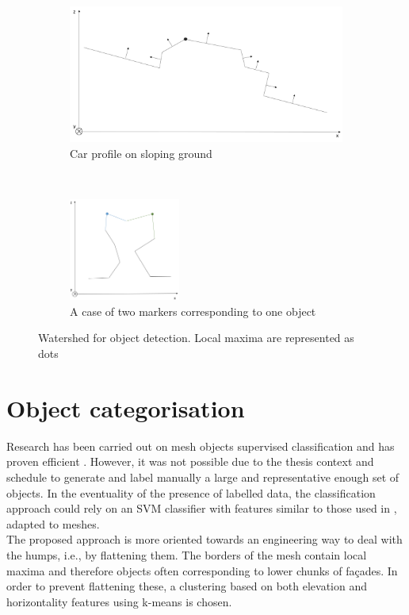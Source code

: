 \documentclass{kththesis}
\begin{document}
\begin{figure}[t!]
    \centering
    \begin{subfigure}[t]{0.5\textwidth}
        \centering
        \includegraphics[width=\textwidth]{images/angles_constraint.png}
        \caption{Car profile on sloping ground }
        \label{fig:ws_angles}
    \end{subfigure}%
    ~ 
    \begin{subfigure}[t]{0.5\textwidth}
        \centering
        \includegraphics[width=0.4\textwidth]{images/merging_markers.png}
        \caption{A case of two markers corresponding to one object}
        \label{fig:ws_merging}
    \end{subfigure}
    \caption{Watershed for object detection. Local maxima are represented as dots}
\end{figure}


\section{Object categorisation}
\label{sec:objectcategorisation}
Research has been carried out on mesh objects supervised classification and has proven efficient \parencite{mesh_classif1, mesh_classif2, mesh_classif3, mesh_classif4}. However, it was not possible due to the thesis context and schedule to generate and label manually a large and representative enough set of objects. In the eventuality of the presence of labelled  data, the classification approach could rely on an SVM classifier with features similar to those used in \textcite{det_seg_class}, adapted to meshes. \\ The proposed approach is more oriented towards an engineering way to deal with the humps, i.e., by flattening them. The borders of the mesh contain local maxima and therefore objects often corresponding to lower chunks of façades. In order to prevent flattening these, a clustering based on both elevation and horizontality features using k-means is chosen. 
\end{document}
